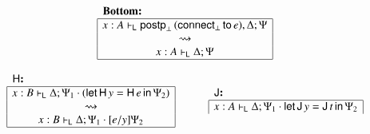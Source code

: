 \documentclass{lmcs}
\newcommand{\DualLNLLogicnt}[1]{\mathit{#1}}
\newcommand{\DualLNLLogicmv}[1]{\mathit{#1}}
\newcommand{\DualLNLLogicsym}[1]{#1}
\begin{document}
\begin{figure}
  \begin{mdframed}     
  \begin{center}
    \begin{math}
      \begin{array}{c}
        \begin{array}{|c|}
          \multicolumn{1}{l}{\textbf{Bottom:}}\\
          \hline
           \DualLNLLogicmv{x}  :  \DualLNLLogicnt{A}  \vdash_{\mathsf{L} }   \mathsf{postp}_\perp\, \DualLNLLogicsym{(}   \mathsf{connect}_\perp\,\mathsf{to}\, \DualLNLLogicnt{e}   \DualLNLLogicsym{)}   \DualLNLLogicsym{,}  \Delta ; \Psi \\
          \rightsquigarrow\\
           \DualLNLLogicmv{x}  :  \DualLNLLogicnt{A}  \vdash_{\mathsf{L} }  \Delta ; \Psi \\
          \hline
        \end{array}\\
        \\
        \begin{array}{lll}
          \begin{array}{|c|}
            \multicolumn{1}{l}{\textbf{$\mathsf{H}$:}}\\
            \hline
             \DualLNLLogicmv{x}  :  \DualLNLLogicnt{B}  \vdash_{\mathsf{L} }  \Delta ; \Psi_{{\mathrm{1}}}  \cdot  \DualLNLLogicsym{(}   \mathsf{let}\,\mathsf{H}\, \DualLNLLogicmv{y}  =   \mathsf{H}\, \DualLNLLogicnt{e}  \,\mathsf{in}\, \Psi_{{\mathrm{2}}}   \DualLNLLogicsym{)} \\
            \rightsquigarrow\\
             \DualLNLLogicmv{x}  :  \DualLNLLogicnt{B}  \vdash_{\mathsf{L} }  \Delta ; \Psi_{{\mathrm{1}}}  \cdot  \DualLNLLogicsym{[}  \DualLNLLogicnt{e}  \DualLNLLogicsym{/}  \DualLNLLogicmv{y}  \DualLNLLogicsym{]}  \Psi_{{\mathrm{2}}} \\
            \hline
          \end{array}
          & \quad &
          \begin{array}{|c|}
            \multicolumn{1}{l}{\textbf{$\mathsf{J}$:}}\\
            \hline
             \DualLNLLogicmv{x}  :  \DualLNLLogicnt{A}  \vdash_{\mathsf{L} }  \Delta ; \Psi_{{\mathrm{1}}}  \cdot   \mathsf{let}\,\mathsf{J}\, \DualLNLLogicmv{y}  =   \mathsf{J}\, \DualLNLLogicnt{t}  \,\mathsf{in}\, \Psi_{{\mathrm{2}}}  \\

\end{array}
\end{array}
\end{array}
\end{math}
\end{center}
\end{mdframed}
\end{figure}
\end{document}
